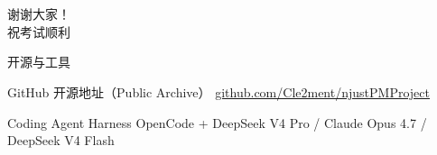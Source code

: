 \section{}

\begin{frame}[standout]
    \Huge 谢谢大家！\\[1em]
    \large 祝考试顺利
\end{frame}

\begin{frame}{开源与工具}
    \begin{block}{GitHub 开源地址（Public Archive）}
        \centering
        \href{https://github.com/Cle2ment/njustPMProject}{github.com/Cle2ment/njustPMProject}
    \end{block}

    \bigskip

    \begin{block}{Coding Agent Harness}
        \centering
        OpenCode + DeepSeek V4 Pro / Claude Opus 4.7 / DeepSeek V4 Flash
    \end{block}
\end{frame}

